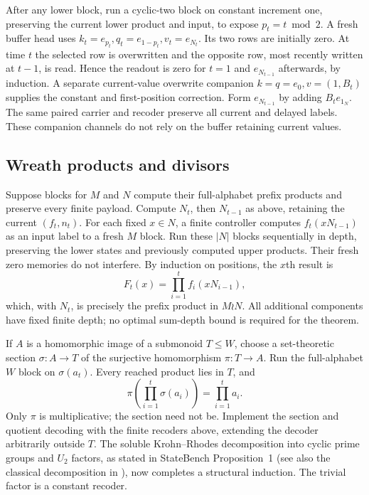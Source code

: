 \documentclass[10pt]{article}
\theoremstyle{remark}
\begin{document}
After any lower block, run a cyclic-two block on constant increment one,
preserving the current lower product and input, to expose $p_t=t\bmod2$.
A fresh buffer head uses $k_t=e_{p_t},q_t=e_{1-p_t},v_t=e_{N_t}$. Its two
rows are initially zero. At time $t$ the selected row is overwritten and the
opposite row, most recently written at $t-1$, is read. Hence the readout is
zero for $t=1$ and $e_{N_{t-1}}$ afterwards, by induction. A separate
current-value overwrite companion $k=q=e_0,v=(1,B_t)$ supplies the constant
and first-position correction. Form $e_{N_{t-1}}$ by adding $B_te_{1_N}$.
The same paired carrier and recoder preserve all current and delayed labels.
These companion channels do not rely on the buffer retaining current values.

\subsection{Wreath products and divisors}
Suppose blocks for $M$ and $N$ compute their full-alphabet prefix products and
preserve every finite payload. Compute $N_t$, then $N_{t-1}$ as above, retaining
the current $(f_t,n_t)$. For each fixed $x\in N$, a finite controller computes
$f_t(xN_{t-1})$ as an input label to a fresh $M$ block. Run these $|N|$ blocks
sequentially in depth, preserving the lower states and previously computed
upper products. Their fresh zero memories do not interfere. By induction on
positions, the $x$th result is
\[
 F_t(x)=\prod_{i=1}^t f_i(xN_{i-1}),
\]
which, with $N_t$, is precisely the prefix product in $M\wr N$.
All additional components have fixed finite depth; no optimal sum-depth bound
is required for the theorem.

If $A$ is a homomorphic image of a submonoid $T\le W$, choose a set-theoretic
section $\sigma:A\to T$ of the surjective homomorphism $\pi:T\to A$. Run the
full-alphabet $W$ block on $\sigma(a_t)$. Every reached product lies in $T$,
and
\[
 \pi\!\left(\prod_{i=1}^t\sigma(a_i)\right)=\prod_{i=1}^t a_i.
\]
Only $\pi$ is multiplicative; the section need not be. Implement the section
and quotient decoding with the finite recoders above, extending the decoder
arbitrarily outside $T$. The soluble Krohn--Rhodes decomposition into cyclic
prime groups and $U_2$ factors, as stated in StateBench Proposition~1
(see also the classical decomposition in \citep[Appendix~I, Theorem~I.3]{nowak}), now
completes a structural induction. The trivial factor is a constant recoder.
\end{document}
